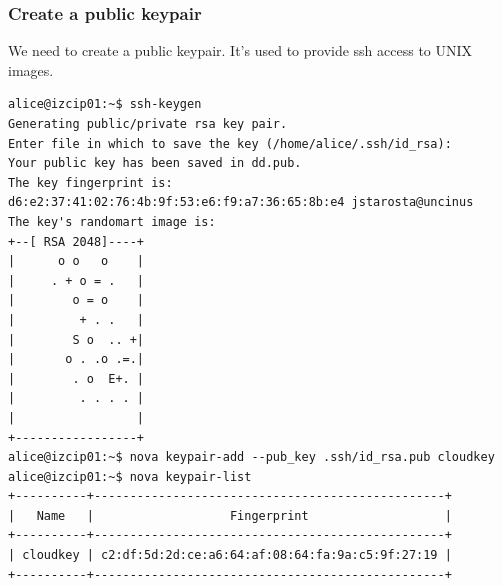 \documentclass[a4paper,bibtotoc,english,liststotoc]{scrartcl}
\begin{document}
\subsubsection{Create a public keypair}
\label{sec:create-publ-keyp}
We need to create a public keypair. It's used to provide ssh access to
UNIX images.
\begin{verbatim}
alice@izcip01:~$ ssh-keygen 
Generating public/private rsa key pair.
Enter file in which to save the key (/home/alice/.ssh/id_rsa):
Your public key has been saved in dd.pub.
The key fingerprint is:
d6:e2:37:41:02:76:4b:9f:53:e6:f9:a7:36:65:8b:e4 jstarosta@uncinus
The key's randomart image is:
+--[ RSA 2048]----+
|      o o   o    |
|     . + o = .   |
|        o = o    |
|         + . .   |
|        S o  .. +|
|       o . .o .=.|
|        . o  E+. |
|         . . . . |
|                 |
+-----------------+
alice@izcip01:~$ nova keypair-add --pub_key .ssh/id_rsa.pub cloudkey
alice@izcip01:~$ nova keypair-list
+----------+-------------------------------------------------+
|   Name   |                   Fingerprint                   |
+----------+-------------------------------------------------+
| cloudkey | c2:df:5d:2d:ce:a6:64:af:08:64:fa:9a:c5:9f:27:19 |
+----------+-------------------------------------------------+
\end{verbatim}
\end{document}
